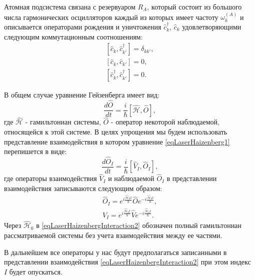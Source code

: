 Атомная подсистема связана с резервуаром $R_A$, который состоит из
большого числа гармонических осцилляторов каждый из которых имеет
частоту $\omega_k^{(A)}$ и описывается операторами рождения и
уничтожения $\hat{c}_k^{\dag}$, $\hat{c}_k$ удовлетворяющими следующим
коммутационным соотношениям:
\begin{eqnarray}
\left[\hat{c}_k, \hat{c}^{\dag}_{k'}\right] = \delta_{kk'},
\nonumber \\
\left[\hat{c}_k, \hat{c}_{k'}\right] = 0,
\nonumber \\
\left[\hat{c}^{\dag}_k, \hat{c}^{\dag}_{k'}\right] = 0.
\nonumber
\end{eqnarray}

В общем случае уравнение Гейзенберга имеет вид:
\begin{equation}
\frac{d \hat{O}}{d t} = \frac{i}{\hbar}\left[\hat{\mathcal{H}},
  \hat{O}\right], 
\label{eqLaserHaizenberg1}
\end{equation}
где $\hat{\mathcal{H}}$ - гамильтониан системы, $\hat{O}$ - оператор
некоторой наблюдаемой, относящейся к этой системе. В целях упрощения
мы будем использовать представление взаимодействия в котором уравнение
\eqref{eqLaserHaizenberg1} перепишется в виде:
\begin{equation}
\frac{d \hat{O}_I}{d t} = \frac{i}{\hbar}\left[\hat{V}_I,
  \hat{O}_I\right], 
\label{eqLaserHaizenbergInteraction1}
\end{equation}
где операторы взаимодействия $\hat{V}_I$ и наблюдаемой $\hat{O}_I$ в
представлении взаимодействия записываются следующим образом: 
\begin{eqnarray}
\hat{O}_I = 
e^{i\frac{\hat{\mathcal{H}}_0t}{\hbar}}
\hat{O}
e^{-i\frac{\hat{\mathcal{H}}_0t}{\hbar}},
\nonumber \\
\hat{V}_I = 
e^{i\frac{\hat{\mathcal{H}}_0t}{\hbar}}
\hat{V}
e^{-i\frac{\hat{\mathcal{H}}_0t}{\hbar}}.
\label{eqLaserHaizenbergInteraction2}
\end{eqnarray}
Через $\hat{\mathcal{H}}_0$ в \eqref{eqLaserHaizenbergInteraction2}
обозначен полный гамильтониан рассматриваемой системы без учета
взаимодействия между ее частями. 

В дальнейшем все операторы у нас будут предполагаться записанными в
представлении взаимодействия \eqref{eqLaserHaizenbergInteraction2} при
этом индекс $I$ будет опускаться.

